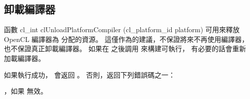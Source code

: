 \subsection{卸載編譯器}

函數
\startclc
cl_int clUnloadPlatformCompiler (cl_platform_id platform)
\stopclc
可用來釋放 OpenCL 編譯器為  分配的資源。
這僅作為的建議，不保證將來不再使用編譯器，也不保證真正卸載編譯器。
如果在  之後調用
  來構建可執行，
有必要的話會重新加載編譯器。

如果執行成功，  會返回 。
否則，返回下列錯誤碼之一：
\startigBase
\item {}，如果  無效。
\stopigBase

